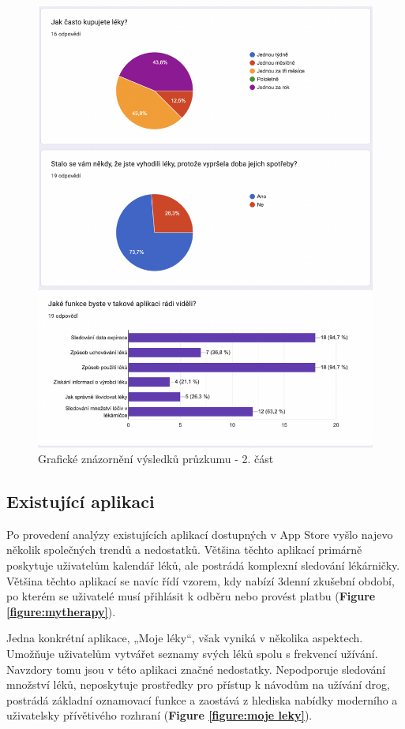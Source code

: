 \documentclass[a4paper, 11pt]{article}
\begin{document}
 \begin{figure}[!ht]
		\centering
		\includegraphics[width=1\linewidth]{Pruzkum1.pdf}
		\caption{Grafické znázornění výsledků průzkumu - 2. část}
		\label{figure:pruzkum1}
	\end{figure}
 \FloatBarrier

	\subsection{Existující aplikaci}
 Po provedení analýzy existujících aplikací dostupných v App Store vyšlo najevo několik společných trendů a nedostatků. Většina těchto aplikací primárně poskytuje uživatelům kalendář léků, ale postrádá komplexní sledování lékárničky. Většina těchto aplikací se navíc řídí vzorem, kdy nabízí 3denní zkušební období, po kterém se uživatelé musí přihlásit k odběru nebo provést platbu (\textbf {Figure \ref{figure:mytherapy}}).

 Jedna konkrétní aplikace, „Moje léky“, však vyniká v několika aspektech. Umožňuje uživatelům vytvářet seznamy svých léků spolu s frekvencí užívání. Navzdory tomu jsou v této aplikaci značné nedostatky. Nepodporuje sledování množství léků, neposkytuje prostředky pro přístup k návodům na užívání drog, postrádá základní oznamovací funkce a zaostává z hlediska nabídky moderního a uživatelsky přívětivého rozhraní (\textbf {Figure \ref{figure:moje leky}}).
\end{document}
